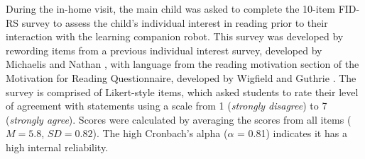 \documentclass{sigchi}
\begin{document}
During the in-home visit, the main child was asked to complete the 10-item FID-RS survey to assess the child's individual interest in reading prior to their interaction with the learning companion robot. This survey was developed by rewording items from a previous individual interest survey, developed by Michaelis and Nathan \cite{Michaelis:2015}, with language from the reading motivation section of the Motivation for Reading Questionnaire, developed by Wigfield and Guthrie \cite{Wigfield:1997}. The survey is comprised of Likert-style items, which asked students to rate their level of agreement with statements using a scale from 1 (\textit{strongly disagree}) to 7 (\textit{strongly agree}). Scores were calculated by averaging the scores from all items ($M = 5.8$, $SD = 0.82$). The high Cronbach's alpha ($\alpha$ = 0.81) indicates it has a high internal reliability.
 


\end{document}
